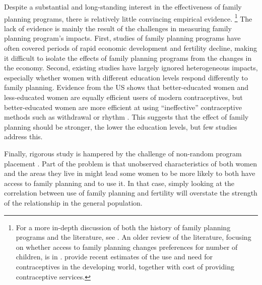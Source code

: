 \documentclass[letterpaper,12pt]{article}
\begin{document}
Despite a substantial and long-standing interest in the effectiveness of
family planning programs, there is relatively little convincing
empirical evidence.%
\footnote{
For a more in-depth discussion of both the history of family planning
programs and the literature, see \citet{Miller2016}.
An older review of the literature, focusing on whether access to family
planning changes preferences for number of children, is in
\citet{Freedman1997}.
\citet{Singh2012} provide recent estimates of the use and need for
contraceptives in the developing world, together with cost of providing
contraceptive services.}
The lack of evidence is mainly the result of the challenges in measuring
family planning program's impacts.
First, studies of family planning programs have often covered periods of
rapid economic development and fertility decline, making it difficult to
isolate the effects of family planning programs from the changes in the
economy.
Second, existing studies have largely ignored heterogeneous impacts,
especially whether women with different education levels respond
differently to family planning.
Evidence from the US shows that better-educated women and less-educated
women are equally efficient users of modern contraceptives, but
better-educated women are more efficient at using ``ineffective''
contraceptive methods such as withdrawal or rhythm
\citep{Rosenzweig1989}.
This suggests that the effect of family planning should be stronger, the
lower the education levels, but few studies address this.


Finally, rigorous study is hampered by the challenge of non-random
program placement \citep{rosenzweig86,pitt93}.
Part of the problem is that unobserved characteristics of both women and
the areas they live in might lead some women to be more likely to both
have access to family planning and to use it.
In that case, simply looking at the correlation between use of family
planning and fertility will overstate the strength of the relationship
in the general population.
\end{document}
